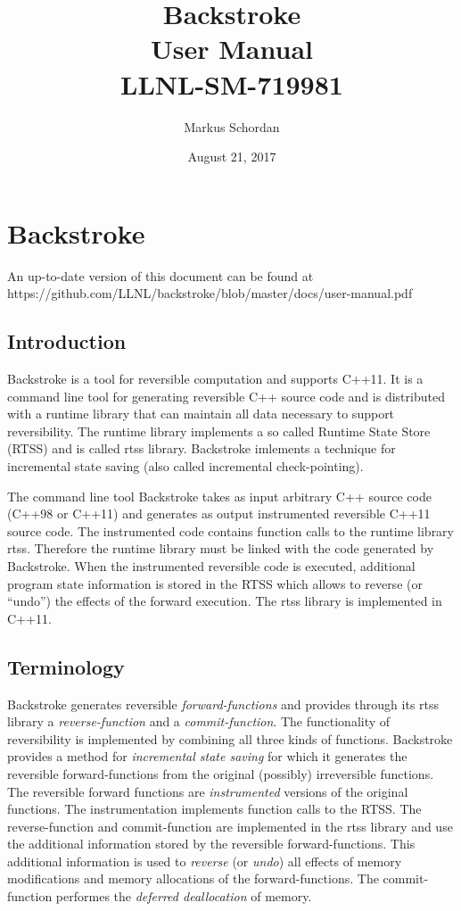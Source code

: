 \documentclass[english,12pt, titlepage]{article}      %
\title{Backstroke \bslongversion\\User Manual\\{\footnotesize LLNL-SM-719981}}  %
\author{Markus Schordan} %
\date{August 21, 2017} %
\newcommand{\forwardfunctions}{forward-functions}
\newcommand{\reversefunction}{reverse-function}
\newcommand{\commitfunction}{commit-function}
\begin{document}
\maketitle
\tableofcontents        
\afterpage{\clearpage}

\section{Backstroke}

An up-to-date version of this document can be found at
{\normalsize https://github.com/LLNL/backstroke/blob/master/docs/user-manual.pdf}

\subsection{Introduction}
Backstroke is a tool for reversible computation and supports C++11. It
is a command line tool for generating reversible C++ source code and
is distributed with a runtime library that can maintain all data
necessary to support reversibility. The runtime library implements a
so called Runtime State Store (RTSS) and is called rtss
library. Backstroke imlements a technique for incremental state saving
(also called incremental check-pointing).

The command line tool Backstroke takes as input arbitrary C++ source
code (C++98 or C++11) and generates as output instrumented reversible
C++11 source code. The instrumented code contains function calls to
the runtime library rtss. Therefore the runtime library must be linked
with the code generated by Backstroke. When the instrumented
reversible code is executed, additional program state information is
stored in the RTSS which allows to reverse (or ``undo'') the effects
of the forward execution. The rtss library is implemented in C++11.

\subsection{Terminology}

Backstroke generates reversible {\em \forwardfunctions{}} and provides
through its rtss library a {\em \reversefunction{}} and a {\em
  \commitfunction}. The functionality of reversibility is implemented
by combining all three kinds of functions. Backstroke provides a
method for {\em incremental state saving} for which it generates the
reversible \forwardfunctions{} from the original (possibly)
irreversible functions. The reversible forward functions are {\em
  instrumented} versions of the original functions. The
instrumentation implements function calls to the RTSS. The
\reversefunction{} and \commitfunction{} are implemented in the rtss
library and use the additional information stored by the reversible
\forwardfunctions. This additional information is used to {\em
  reverse} (or {\em undo}) all effects of memory modifications and
memory allocations of the \forwardfunctions. The commit-function
performes the {\em deferred deallocation} of memory.
\end{document}
